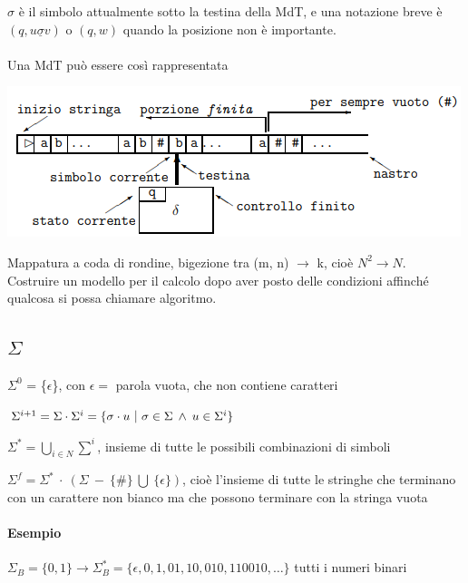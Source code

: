 \documentclass[10pt]{book}
\begin{document}
$\sigma$ è il simbolo attualmente sotto la testina della MdT, e una notazione breve è $(q, u\underline{\sigma}v)$ o $(q,w)$ quando la posizione non è importante.\\\\
Una MdT può essere così rappresentata
\begin{center}
	\includegraphics[scale=0.75]{mdt.png}
\end{center}
Mappatura a coda di rondine, bigezione tra (m, n) $\rightarrow$ k, cioè $N^2 \rightarrow N$.\\
Costruire un modello per il calcolo dopo aver posto delle condizioni affinché qualcosa si possa chiamare algoritmo.

\subsection{$\Sigma$}
\begin{list}{}{}
	\item $\Sigma^0$ = \{$\epsilon$\}, con $\epsilon =$ parola vuota, che non contiene caratteri
	\item $\Sigma^{i+1} = \Sigma \cdot \Sigma^i = \{\sigma \cdot u \:\:\vline\:\: \sigma \in \Sigma \:\wedge\: u \in \Sigma^i\}$
	\item $\Sigma^* = \bigcup_{i \in N}\sum^i$, insieme di tutte le possibili combinazioni di simboli
	\item $\Sigma^f = \Sigma^* \:\cdot\: (\Sigma \:-\: \{\#\} \:\bigcup\: \{\epsilon\})$, cioè l'insieme di tutte le stringhe che terminano con un carattere non bianco ma che possono terminare con la stringa vuota
\end{list}
\paragraph{Esempio} $\Sigma_B = \{0, 1\} \longrightarrow \Sigma_B^* = \{\epsilon, 0, 1, 01, 10, 010, 110010, \ldots\}$ tutti i numeri binari
\pagebreak
\end{document}
